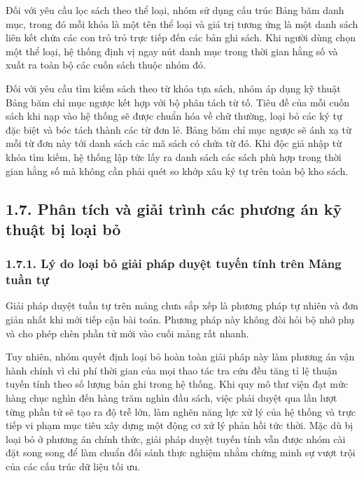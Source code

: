 \documentclass[14pt,a4paper]{extarticle}
\begin{document}
Đối với yêu cầu lọc sách theo thể loại, nhóm sử dụng cấu trúc Bảng băm danh mục, trong đó mỗi khóa là một tên thể loại và giá trị tương ứng là một danh sách liên kết chứa các con trỏ trỏ trực tiếp đến các bản ghi sách. Khi người dùng chọn một thể loại, hệ thống định vị ngay nút danh mục trong thời gian hằng số và xuất ra toàn bộ các cuốn sách thuộc nhóm đó.

Đối với yêu cầu tìm kiếm sách theo từ khóa tựa sách, nhóm áp dụng kỹ thuật Bảng băm chỉ mục ngược kết hợp với bộ phân tách từ tố. Tiêu đề của mỗi cuốn sách khi nạp vào hệ thống sẽ được chuẩn hóa về chữ thường, loại bỏ các ký tự đặc biệt và bóc tách thành các từ đơn lẻ. Bảng băm chỉ mục ngược sẽ ánh xạ từ mỗi từ đơn này tới danh sách các mã sách có chứa từ đó. Khi độc giả nhập từ khóa tìm kiếm, hệ thống lập tức lấy ra danh sách các sách phù hợp trong thời gian hằng số mà không cần phải quét so khớp xâu ký tự trên toàn bộ kho sách.

\subsection*{1.7. Phân tích và giải trình các phương án kỹ thuật bị loại bỏ}

\subsubsection*{1.7.1. Lý do loại bỏ giải pháp duyệt tuyến tính trên Mảng tuần tự}

Giải pháp duyệt tuần tự trên mảng chưa sắp xếp là phương pháp tự nhiên và đơn giản nhất khi mới tiếp cận bài toán. Phương pháp này không đòi hỏi bộ nhớ phụ và cho phép chèn phần tử mới vào cuối mảng rất nhanh.

Tuy nhiên, nhóm quyết định loại bỏ hoàn toàn giải pháp này làm phương án vận hành chính vì chi phí thời gian của mọi thao tác tra cứu đều tăng tỉ lệ thuận tuyến tính theo số lượng bản ghi trong hệ thống. Khi quy mô thư viện đạt mức hàng chục nghìn đến hàng trăm nghìn đầu sách, việc phải duyệt qua lần lượt từng phần tử sẽ tạo ra độ trễ lớn, làm nghẽn năng lực xử lý của hệ thống và trực tiếp vi phạm mục tiêu xây dựng một động cơ xử lý phản hồi tức thời. Mặc dù bị loại bỏ ở phương án chính thức, giải pháp duyệt tuyến tính vẫn được nhóm cài đặt song song để làm chuẩn đối sánh thực nghiệm nhằm chứng minh sự vượt trội của các cấu trúc dữ liệu tối ưu.
\end{document}

